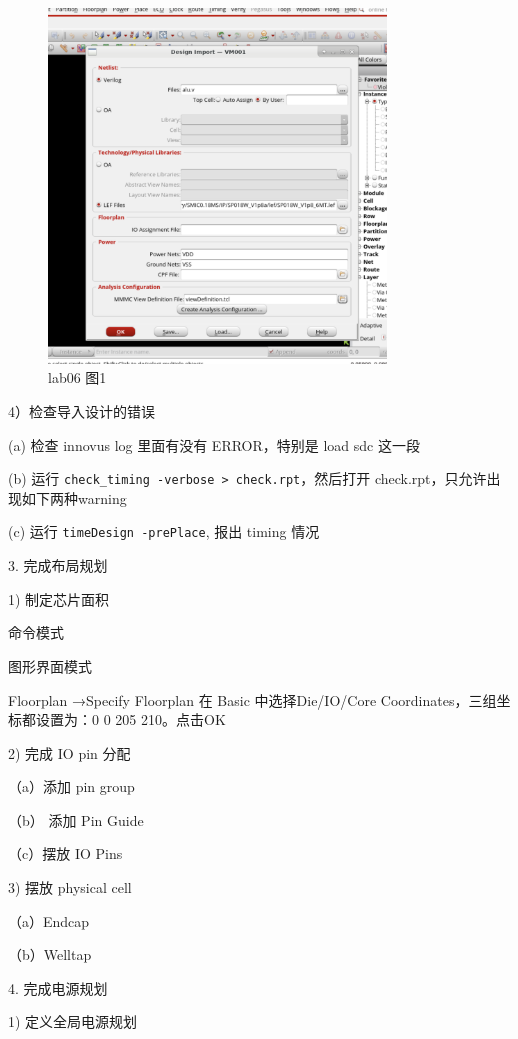 \begin{figure}[H]
    \centering
    \includegraphics[width=0.8\textwidth]{images/lab06-01.png}
    \caption{lab06 图1}
\end{figure}
 
4）检查导入设计的错误

(a) 检查 innovus log 里面有没有 ERROR，特别是 load sdc 这一段

(b) 运行 \texttt{check\_timing -verbose > check.rpt}，然后打开 check.rpt，只允许出现如下两种warning
 
(c) 运行 \texttt{timeDesign -prePlace},  报出 timing 情况
 
3.  完成布局规划

1) 制定芯片面积

命令模式
 
图形界面模式

Floorplan →Specify Floorplan  在 Basic 中选择Die/IO/Core Coordinates，三组坐标都设置为：0 0 205 210。点击OK
 
2) 完成 IO pin 分配

（a）添加 pin group
 
（b） 添加 Pin Guide

（c）摆放 IO Pins

3) 摆放 physical cell

（a）Endcap

（b）Welltap
 
4.  完成电源规划

1) 定义全局电源规划


